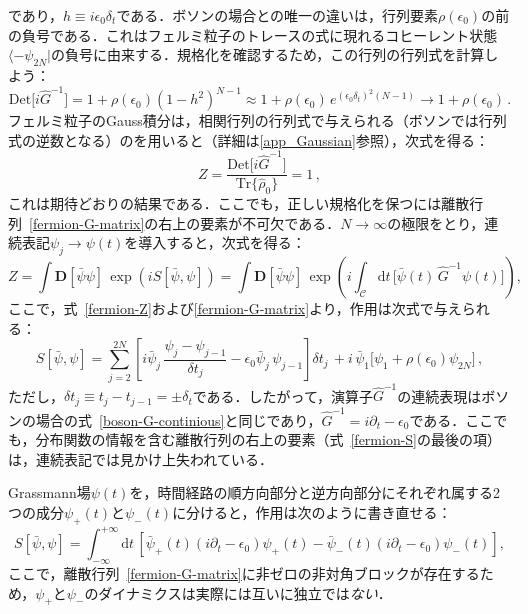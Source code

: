 \documentclass[a4paper,11pt]{ltjsarticle}
\def\Tr{\mathrm{Tr}}
\def\d{\mathrm{d}}
\def\D{\mathbf{D}}
\begin{document}
であり，$h\equiv i\epsilon_0\delta_t$である．ボソンの場合との唯一の違いは，行列要素$\rho(\epsilon_0)$の前の負号である．これはフェルミ粒子のトレースの式に現れるコヒーレント状態$\langle-\psi_{2N}|$の負号に由来する．規格化を確認するため，この行列の行列式を計算しよう：
\begin{equation}\label{fermion-determinant}
\mathrm{Det}\big[i\hat{G}^{-1}\big]=1+\rho(\epsilon_0)(1-h^2)^{N-1}
\approx1+ \rho(\epsilon_0)\,e^{(\epsilon_0\delta_t)^2(N-1)}\to
1+\rho(\epsilon_0)\,.
\end{equation}
フェルミ粒子のGauss積分は，相関行列の行列式で与えられる（ボソンでは行列式の逆数となる）のを用いると（詳細は\ref{app_Gaussian}参照），次式を得る：
\begin{equation}\label{fermion-Z-unity}
Z=\frac{\mathrm{Det}\big[i\hat{G}^{-1}\big]}{\Tr\{\hat{\rho}_0 \} }
= 1\, ,
\end{equation}
これは期待どおりの結果である．ここでも，正しい規格化を保つには離散行列~\eqref{fermion-G-matrix}の右上の要素が不可欠である．$N\to \infty$の極限をとり，連続表記$\psi_j\to \psi(t)$を導入すると，次式を得る：
\begin{equation}\label{fermion-Z-1}
Z=\int\D[\bar{\psi} \psi]\, \exp\left(iS[\bar{\psi},\psi]\right) =
\int\D[\bar{\psi} \psi] \, \exp\left(i \int_{\mathcal{C}}\d t\,\big[
\bar\psi(t)\,\hat{G}^{-1}\psi(t)\big] \right),
\end{equation}
ここで，式~\eqref{fermion-Z}および\eqref{fermion-G-matrix}より，作用は次式で与えられる：
\begin{equation}\label{fermion-S}
S[\bar{\psi},\psi]=
\sum\limits_{j=2}^{2N}\left[i\bar{\psi}_j\,\frac{\psi_j-\psi_{j-1}}{\delta
t_j} -\epsilon_0\bar{\psi}_{j}\,\psi_{j-1}\right]\delta
t_j\,+i\,\bar{\psi}_1\Big[\psi_1+\rho(\epsilon_0)\psi_{2N}\Big]\, ,
\end{equation}
ただし，$\delta t_j\equiv t_j-t_{j-1}=\pm \delta_t$である．したがって，演算子$\hat G^{-1}$の連続表現はボソンの場合の式~\eqref{boson-G-continious}と同じであり，$\hat G^{-1}=
i\partial_t-\epsilon_0$である．ここでも，分布関数の情報を含む離散行列の右上の要素（式~\eqref{fermion-S}の最後の項）は，連続表記では見かけ上失われている．



Grassmann場$\psi(t)$を，時間経路の順方向部分と逆方向部分にそれぞれ属する2つの成分$\psi_{+}(t)$と$\psi_{-}(t)$に分けると，作用は次のように書き直せる：
\begin{equation}\label{fermion-S-1}
S[\bar{\psi},\psi]=\int_{-\infty}^{+\infty}\d t\,\left[
\bar{\psi}_{+}(t)(i\partial_t-\epsilon_0)
\psi_{+}(t)-\bar{\psi}_{-}(t)(i\partial_t-\epsilon_0)
\psi_{-}(t)\right] ,
\end{equation}
ここで，離散行列~\eqref{fermion-G-matrix}に非ゼロの非対角ブロックが存在するため，$\psi_{+}$と$\psi_{-}$のダイナミクスは実際には互いに独立では{\em ない}．
\end{document}
